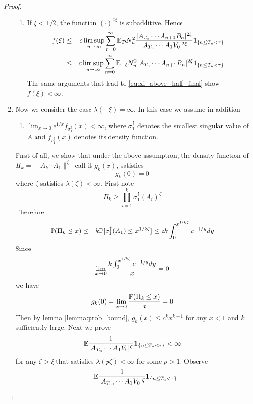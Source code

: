\documentclass{article}
\theoremstyle{remark}
\begin{document}
\begin{proof}
\begin{enumerate}
\begin{enumerate}
      \item If $\xi < 1/2$, the function $(\cdot)^{2\xi}$ is
        subadditive. Hence
        \begin{eqnarray*}
          f(\xi) &\leq& c \limsup_{u \to \infty}
          \sum_{n=0}^\infty \E_{\mathcal D} N_u^2
          {|A_{T_u} \cdots A_{n+1}B_n|^{2\xi}
            \over
            |A_{T_u} \cdots A_1 V_0|^{2\xi}
          }
          \1{n \leq T_u < \tau} \\
          &\leq& c \limsup_{u \to \infty}
          \sum_{n=0}^{\infty}
            \E_{-\xi} N_u^2 
            |A_{T_u} \cdots A_{n+1} B_n|^{2\xi}
            \1{n \leq T_u < \tau}
        \end{eqnarray*}
        The same arguments that lead to \eqref{eq:xi_above_half_final}
        show $f(\xi) < \infty$.
    \end{enumerate}
  \item Now we consider the case $\lambda(-\xi) = \infty$. In this
    case we assume in addition
    \begin{enumerate}
    \item $\lim_{x \to 0} e^{1/x} f_{\sigma_1^{\uparrow}}(x)  <
      \infty$, where $\sigma_1^{\uparrow}$ denotes the smallest
      singular value of $A$ and $f_{\sigma_1^{\uparrow}}(x)$ denotes its
      density function.
    \end{enumerate}
    First of all, we show that under the above assumption, the density
    function of $\Pi_k = \|A_k \cdots A_1\|^\zeta$, call it $g_k(x)$,
    satisfies
    \[
    g_k(0) = 0
    \]
    where $\zeta$ satisfies $\lambda(\zeta) < \infty$. First note
    \[
    \Pi_k \geq \prod_{i=1}^k \sigma_1^{\uparrow}(A_i)^\zeta
    \]
    Therefore
    \begin{eqnarray*}
      \P(\Pi_k \leq x) &\leq& k \P[\sigma_1^{\uparrow}(A_1)
      \leq x^{1/k \zeta}] \leq c k \int_0^{x^{1/k\zeta}} e^{-1/y} dy
    \end{eqnarray*}
    Since
    \[
    \lim_{x \to 0} {k \int_0^{x^{1/k\zeta}} e^{-1/y} dy \over x} = 0
    \]
    we have
    \[
    g_k(0) = \lim_{x \to 0} {\P(\Pi_k \leq x) \over x} = 0
    \]
    Then by lemma \ref{lemma:prob_bound}, $g_k(x) \leq c^k x^{k-1}$
    for any $x < 1$ and $k$ sufficiently large. Next we prove
    \[
    \E {1 \over |A_{T_u} \cdots A_1 V_0|^\zeta}\1{n \leq T_u < \tau} < \infty
    \]
    for any $\zeta > \xi$ that satisfies $\lambda(p\zeta) < \infty$ for some
    $p > 1$. Observe
    \begin{eqnarray*}
      && \E {1 \over |A_{T_u}, \cdots A_1 V_0|^\zeta} \1{n \leq T_u < \tau}\\

\end{eqnarray*}
\end{enumerate}
\end{proof}
\end{document}
